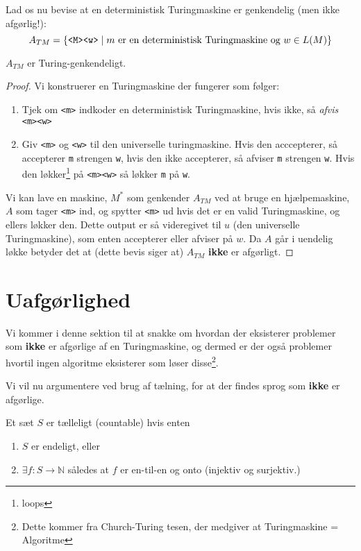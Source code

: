 Lad os nu bevise at en deterministisk Turingmaskine er genkendelig (men ikke afgørlig!):
\begin{equation*}
	A_{TM} = \{\text{\texttt{<M><w>}} \mid m \text{ er en deterministisk Turingmaskine og } w \in L(M)\}
\end{equation*}

\begin{theorem}
	$A_{TM}$ er Turing-genkendeligt.
\end{theorem}

\begin{proof}
	Vi konstruerer en Turingmaskine der fungerer som følger:
	\begin{enumerate}
		\item Tjek om \texttt{<m>} indkoder en deterministisk Turingmaskine, hvis ikke, så \textit{afvis} \texttt{<m><w>}
		\item Giv \texttt{<m>} og \texttt{<w>} til den universelle turingmaskine. Hvis den acccepterer, så accepterer \texttt{m} strengen \texttt{w}, hvis den ikke accepterer, så afviser \texttt{m} strengen \texttt{w}. Hvis den løkker\footnote{loops} på \texttt{<m><w>} så løkker \texttt{m} på \texttt{w}.
	\end{enumerate}

	Vi kan lave en maskine, $M^{*}$ som  genkender $A_{TM}$ ved at bruge en hjælpemaskine, $A$ som tager \texttt{<m>} ind, og spytter \texttt{<m>} ud hvis det er en valid Turingmaskine, og ellers løkker den. Dette output er så videregivet til $u$ (den universelle Turingmaskine), som enten accepterer eller afviser på $w$. Da $A$ går i uendelig løkke betyder det at (dette bevis siger at) $A_{TM}$ \textbf{ikke} er afgørligt.

\end{proof}

\section{Uafgørlighed}%
\label{sec:undecidability}

Vi kommer i denne sektion til at snakke om hvordan der eksisterer problemer som \textbf{ikke} er afgørlige af en Turingmaskine, og dermed er der også problemer hvortil ingen algoritme eksisterer som løser disse\footnote{Dette kommer fra Church-Turing tesen, der medgiver at Turingmaskine = Algoritme}.

Vi vil nu argumentere ved brug af tælning, for at der findes sprog som \textbf{ikke} er afgørlige.

\begin{definition}
	\label{def:countable}
	Et sæt $S$ er tælleligt (countable) hvis enten
	\begin{enumerate}
		\item $S$ er endeligt, eller
		\item $\exists f : S \rightarrow \mathbb{N}$ således at $f$ er en-til-en og onto (injektiv og surjektiv.)
	\end{enumerate}
\end{definition}

